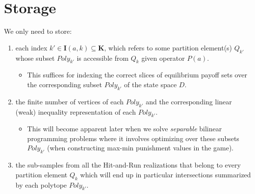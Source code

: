 \documentclass[a4paper,10pt,english]{sphinxmanual}
\begin{document}
\section{Storage}
\label{compute_statespace:storage}
We only need to store:
\begin{enumerate}
\item {} 
each index $k' \in \mathbf{I}(a,k) \subseteq \mathbf{K}$, which refers to some partition element(s) $Q_{k'}$ whose subset $Poly_{k'}$ is accessible from $Q_{k}$ given operator $P(a)$.
\begin{itemize}
\item {} 
This suffices for indexing the correct slices of equilibrium payoff sets over the corresponding subset $Poly_{k'}$ of the state space $D$.

\end{itemize}

\item {} 
the finite number of vertices of each $Poly_{k'}$ and the corresponding linear (weak) inequality representation of each $Poly_{k'}$.
\begin{itemize}
\item {} 
This will become apparent later when we solve \emph{separable} bilinear programming problems where it involves optimizing over these subsets $Poly_{k'}$ (when constructing max-min punishment values in the game).

\end{itemize}

\item {} 
the sub-samples from all the Hit-and-Run realizations that belong to every partition element
$Q_k$ which will end up in particular intersections summarized by
each polytope $Poly_{k'}$.

\end{enumerate}
\end{document}
